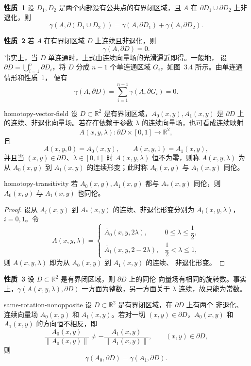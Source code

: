 \noindent\textbf{性质~1}\quad
设 $D_1,D_2$ 是两个内部没有公共点的有界闭区域，且 $A$ 在
$\partial D_1\cup\partial D_2$ 上非退化，则
\[
  \gamma(A,\partial(D_1\cup D_2))
  =\gamma(A,\partial D_1)+\gamma(A,\partial D_2). \tag{1.3}
\]

\noindent\textbf{性质~2}\quad
若 $A$ 在有界闭区域 $D$ 上连续且非退化，则
\[
  \gamma(A,\partial D)=0.
\]
事实上，当 $D$ 单连通时，上式由连续向量场的光滑逼近即得。一般地，
设 $\partial D=\bigcup_{i=1}^n\partial D_i$，将 $D$ 分成
$n-1$ 个单连通区域 $G_i$，如图~3.4 所示。由单连通情形和性质~1，
便有
\[
  \gamma(A,\partial D)=\sum_{i=1}^{n-1}\gamma(A,\partial G_i)=0.
\]


\begin{definition}{}{homotopy-vector-field}
设 $D\subset\mathbb{R}^2$ 是有界闭区域，$A_0(x,y),A_1(x,y)$
是 $\partial D$ 上的连续、非退化向量场。若存在依赖于参数
$\lambda$ 的连续向量场，也可看成连续映射
\[
  A(x,y,\lambda):\partial D\times[0,1]\longrightarrow\mathbb{R}^2,
\]
且
\[
  A(x,y,0)=A_0(x,y),\qquad A(x,y,1)=A_1(x,y),
\]
并且当 $(x,y)\in\partial D$、$\lambda\in[0,1]$ 时
$A(x,y,\lambda)$ 恒不为零，则称 $A(x,y,\lambda)$ 为从
$A_0(x,y)$ 到 $A_1(x,y)$ 的连续形变；此时称 $A_0(x,y)$ 与
$A_1(x,y)$ 同伦。
\end{definition}

\begin{theorem}{}{homotopy-transitivity}
若 $A_0(x,y),A_1(x,y)$ 都与 $A_*(x,y)$ 同伦，则
$A_0(x,y)$ 与 $A_1(x,y)$ 也同伦。
\end{theorem}

\begin{proof}
设从 $A_i(x,y)$ 到 $A_*(x,y)$ 的连续、非退化形变分别为
$\overline{A}_i(x,y,\lambda)$，$i=0,1$。令
\[
  A(x,y,\lambda)=
  \begin{cases}
    \overline{A}_0(x,y,2\lambda),&0\leq\lambda\leq\dfrac12,\\
    \overline{A}_1(x,y,2-2\lambda),&\dfrac12<\lambda\leq1,
  \end{cases}
\]
则 $A(x,y,\lambda)$ 即为从 $A_0(x,y)$ 到 $A_1(x,y)$ 的连续、
非退化形变。
\end{proof}

\noindent\textbf{性质~3}\quad
设 $D\subset\mathbb{R}^2$ 是有界闭区域，则 $\partial D$ 上的同伦
向量场有相同的旋转数。事实上，$\gamma(A(x,y,\lambda),\partial D)$
一方面为整数，另一方面关于 $\lambda$ 连续，故只能为常数。

\begin{theorem}{}{same-rotation-nonopposite}
设 $D\subset\mathbb{R}^2$ 是有界闭区域，在 $\partial D$ 上有两个
非退化、连续向量场 $A_0(x,y)$ 和 $A_1(x,y)$。若对一切
$(x,y)\in\partial D$，$A_0(x,y)$ 和 $A_1(x,y)$ 的方向恒不相反，即
\[
  \dfrac{A_0(x,y)}{\lVert A_0(x,y)\rVert}
  \ne-\dfrac{A_1(x,y)}{\lVert A_1(x,y)\rVert},
  \qquad (x,y)\in\partial D,
\]
则
\[
  \gamma(A_0,\partial D)=\gamma(A_1,\partial D). \tag{1.5}
\]
\end{theorem}

